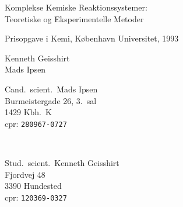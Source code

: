  
\setlength{\parindent}{0mm}
\setlength{\evensidemargin}{1.0cm}
\setlength{\oddsidemargin}{0.01cm}
\setlength{\topmargin}{0.925cm}
\setlength{\textwidth}{16.0cm}
\setlength{\textheight}{25cm}
\setlength{\headsep}{-1cm}
\setlength{\footskip}{2.0cm}
\pagestyle{empty}



\vspace{-3cm}

\begin{center}
\Huge\bsf
Komplekse Kemiske Reaktionssystemer:\\
Teoretiske og Eksperimentelle Metoder
\end{center}

\vspace{1.25cm}
\large\bsf
Prisopgave i Kemi, K{\o}benhavn Universitet, 1993

\vspace{1.25cm}
\Large\bsf
Kenneth Geisshirt\\
Mads Ipsen





\vspace{1cm}
{
\vspace{0.5cm}
\epsfxsize=10cm
\epsfysize=12cm
\vspace{0.5cm}
}
{}

\vfill

\normalsize\bsf
\vspace{2.5mm}

\begin{minipage}{5cm}
Cand.\ scient.\ Mads Ipsen\\
Burmeistergade 26, 3.\ sal\\
1429 Kbh.\ K\\
cpr: \verb+280967-0727+
\end{minipage}
\ \hspace{2cm} \
\begin{minipage}{6cm}
Stud.\ scient.\ Kenneth Geisshirt\\
Fjordvej 48\\
3390 Hundested\\
cpr: \verb+120369-0327+
\end{minipage}



